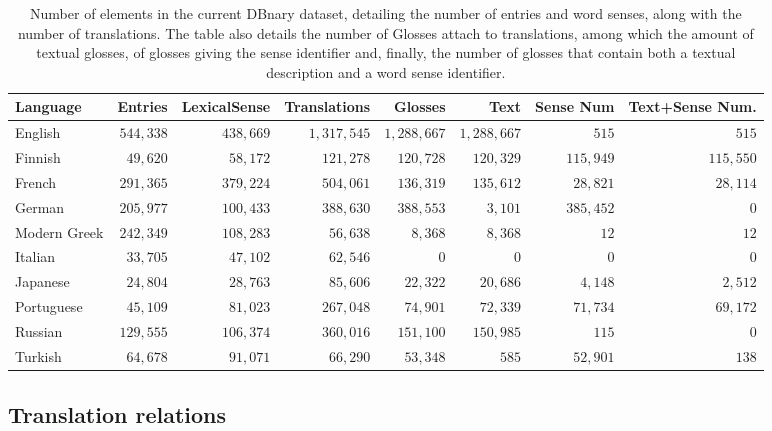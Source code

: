 \documentclass[10pt, a4paper]{article}
\begin{document}
\begin{table}[htb!]
\begin{center}\begin{footnotesize}
\begin{tabular}{lrrrrrrr}
\textbf{Language} & \textbf{Entries} & \textbf{LexicalSense} & \textbf{Translations} & \textbf{Glosses} & \textbf{Text} &  \textbf{Sense Num} & \textbf{Text+Sense Num.}\\
\hline
English & $544,338$ & $438,669$ & $1,317,545$ & $1,288,667$ & $1,288,667$ & $515$ & $515$ \\
Finnish & $49,620$ & $58,172$ & $121,278$ & $120,728$ & $120,329$ & $115,949$ & $115,550$ \\
French & $291,365$ & $379,224$ & $504,061$ & $136,319$ & $135,612$ & $28,821$ & $28,114$ \\
German & $205,977$ & $100,433$ & $388,630$ & $388,553$ & $3,101$ & $385,452$ & $0$ \\
Modern Greek & $242,349$ & $108,283$ & $56,638$ & $8,368$ & $8,368$ & $12$ & $12$ \\
Italian & $33,705$ & $47,102$ & $62,546$ & $0$ & $0$ & $0$ & $0$ \\
Japanese & $24,804$ & $28,763$ & $85,606$ & $22,322$ & $20,686$ & $4,148$ & $2,512$ \\
Portuguese & $45,109$ & $81,023$ & $267,048$ & $74,901$ & $72,339$ & $71,734$ & $69,172$ \\
Russian & $129,555$ & $106,374$ & $360,016$ & $151,100$ & $150,985$ & $115$ & $0$ \\
Turkish & $64,678$ & $91,071$ & $66,290$ & $53,348$ & $585$ & $52,901$ & $138$ \\
\hline
\end{tabular}
\caption{Number of elements in the current DBnary dataset, detailing the number of entries and word senses, along with the number of translations. The table also details the number of Glosses attach to translations, among which the amount of textual glosses, of glosses giving the sense identifier and, finally, the number of glosses that contain both a textual description and a word sense identifier.}
\label{lemon-elts}
\end{footnotesize}\end{center}
\end{table}

\subsection{Translation relations}
\end{document}
